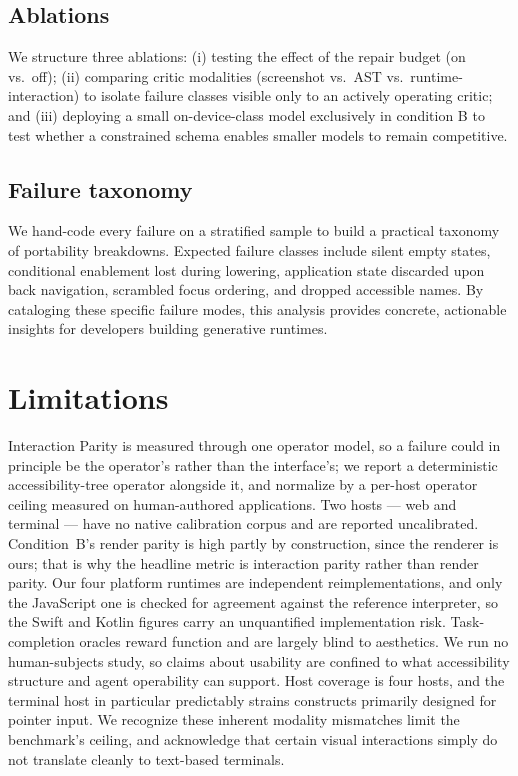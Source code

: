 \documentclass{article}
\begin{document}
\subsection{Ablations}
We structure three ablations: (i) testing the effect of the repair budget (on vs.\ off); (ii) comparing critic modalities (screenshot vs.\ AST vs.\ runtime-interaction) to isolate failure classes visible only to an actively operating critic; and (iii) deploying a small on-device-class model exclusively in condition B to test whether a constrained schema enables smaller models to remain competitive.

\subsection{Failure taxonomy}
We hand-code every failure on a stratified sample to build a practical taxonomy of portability breakdowns. Expected failure classes include silent empty states, conditional enablement lost during lowering, application state discarded upon back navigation, scrambled focus ordering, and dropped accessible names. By cataloging these specific failure modes, this analysis provides concrete, actionable insights for developers building generative runtimes.

\section{Limitations}
Interaction Parity is measured through one operator model, so a failure could in
principle be the operator's rather than the interface's; we report a
deterministic accessibility-tree operator alongside it, and normalize by a
per-host operator ceiling measured on human-authored applications. Two hosts ---
web and terminal --- have no native calibration corpus and are reported
uncalibrated. Condition~B's render parity is high partly by construction, since
the renderer is ours; that is why the headline metric is interaction parity
rather than render parity. Our four platform runtimes are independent
reimplementations, and only the JavaScript one is checked for agreement against
the reference interpreter, so the Swift and Kotlin figures carry an
unquantified implementation risk.
Task-completion oracles reward function and are largely blind to aesthetics. We
run no human-subjects study, so claims about usability are confined to what
accessibility structure and agent operability can support. Host coverage is
four hosts, and the terminal host in particular predictably strains constructs primarily designed for pointer input. We recognize these inherent modality mismatches limit the benchmark's ceiling, and acknowledge that certain visual interactions simply do not translate cleanly to text-based terminals.
\end{document}
